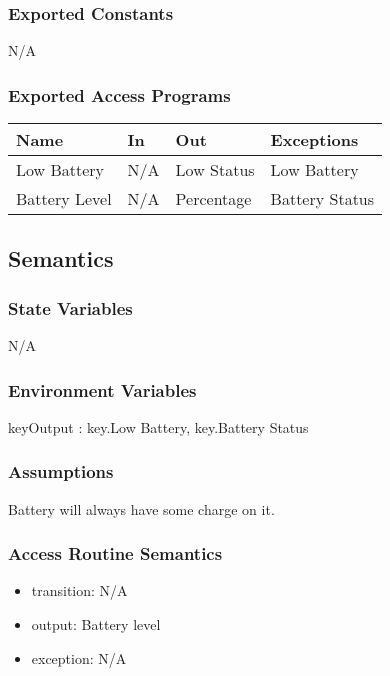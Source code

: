 \documentclass[12pt, titlepage]{article}
\begin{document}
\subsubsection{Exported Constants}

N/A

\subsubsection{Exported Access Programs}

\begin{center}
\begin{tabular}{p{2cm} p{4cm} p{4cm} p{2cm}}
\hline
\textbf{Name} & \textbf{In} & \textbf{Out} & \textbf{Exceptions} \\
\hline
Low Battery & N/A & Low Status & Low Battery \\
\hline
Battery Level & N/A & Percentage & Battery Status \\
\hline
\end{tabular}
\end{center}

\subsection{Semantics}

\subsubsection{State Variables}

N/A

\subsubsection{Environment Variables}

keyOutput : {key.Low Battery, key.Battery Status}

\subsubsection{Assumptions}

Battery will always have some charge on it.

\subsubsection{Access Routine Semantics}

\noindent
\begin{itemize}
\item transition: N/A 
\item output: Battery level
\item exception: N/A
\end{itemize}
\end{document}
